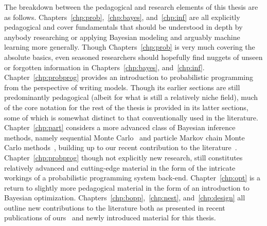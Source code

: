 The breakdown between the pedagogical and research elements of this thesis are as follows.
Chapters~\ref{chp:prob},~\ref{chp:bayes}, and~\ref{chp:inf} are all explicitly pedagogical
and cover fundamentals that should be understood in depth by anybody researching or
applying Bayesian modeling and arguably machine learning more generally.  Though
Chapters~\ref{chp:prob} is very much covering the absolute basics,
even seasoned researchers should hopefully find nuggets of unseen or forgotten information 
in Chapters~\ref{chp:bayes}, and~\ref{chp:inf}.  Chapter~\ref{chp:probprog} provides an
 introduction to
probabilistic programming from the perspective of writing models.  Though its earlier
sections are still predominantly pedagogical (albeit for what is still a relatively niche field),
much of the core notation for the rest of the thesis is provided in its latter sections, some of
which is somewhat distinct to that conventionally used in the literature.
Chapter~\ref{chp:part} considers a more advanced class of Bayesian inference methods,
namely sequential Monte Carlo~\citep{doucet2009tutorial} and particle Markov chain Monte
Carlo methods~\citep{andrieu2010particle},
building up to our recent contribution to the literature~\citep{rainforth2016interacting}.
Chapter~\ref{chp:probprog} though not explicitly new research, still constitutes
relatively advanced and cutting-edge material in the form of the intricate workings
of a probabilistic programming system back-end.   Chapter~\ref{chp:opt} is a return
to slightly more pedagogical material in the form of an introduction to Bayesian optimization.
Chapters~\ref{chp:bopp},~\ref{chp:nest}, and~\ref{chp:design} all outline new
contributions to the literature both as presented in recent publications of
ours~\citep{rainforth2016nips,rainforth2017pitfalls,vincent2017darc} and newly introduced
material for this thesis.